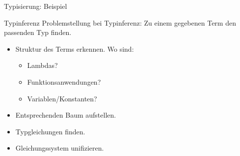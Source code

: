 \documentclass{beamer}
\begin{document}
\begin{frame}{Typisierung: Beispiel}
\end{frame}

\begin{frame}{Typinferenz}
    Problemstellung bei Typinferenz: Zu einem gegebenen Term den passenden Typ finden.
  
    \begin{itemize}
      \item Struktur des Terms erkennen. Wo sind:
      \begin{itemize}
        \item Lambdas?
        \item Funktionsanwendungen?
        \item Variablen/Konstanten?
      \end{itemize}
      \item Entsprechenden Baum aufstellen.
      \item Typgleichungen finden.
      \item Gleichungssystem unifizieren.
    \end{itemize}
\end{frame}
\end{document}
